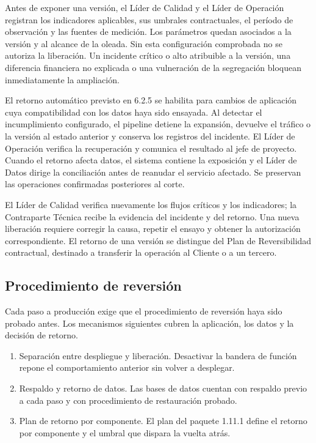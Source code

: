 \documentclass[11pt]{article}
\begin{document}
Antes de exponer una versión, el Líder de Calidad y el Líder de Operación registran los indicadores aplicables, sus umbrales contractuales, el período de observación y las fuentes de medición. Los parámetros quedan asociados a la versión y al alcance de la oleada. Sin esta configuración comprobada no se autoriza la liberación. Un incidente crítico o alto atribuible a la versión, una diferencia financiera no explicada o una vulneración de la segregación bloquean inmediatamente la ampliación.

El retorno automático previsto en 6.2.5 se habilita para cambios de aplicación cuya compatibilidad con los datos haya sido ensayada. Al detectar el incumplimiento configurado, el pipeline detiene la expansión, devuelve el tráfico o la versión al estado anterior y conserva los registros del incidente. El Líder de Operación verifica la recuperación y comunica el resultado al jefe de proyecto. Cuando el retorno afecta datos, el sistema contiene la exposición y el Líder de Datos dirige la conciliación antes de reanudar el servicio afectado. Se preservan las operaciones confirmadas posteriores al corte.

El Líder de Calidad verifica nuevamente los flujos críticos y los indicadores; la Contraparte Técnica recibe la evidencia del incidente y del retorno. Una nueva liberación requiere corregir la causa, repetir el ensayo y obtener la autorización correspondiente. El retorno de una versión se distingue del Plan de Reversibilidad contractual, destinado a transferir la operación al Cliente o a un tercero.

\subsection*{Procedimiento de reversión}

Cada paso a producción exige que el procedimiento de reversión haya sido probado antes. Los mecanismos siguientes cubren la aplicación, los datos y la decisión de retorno.

\begin{enumerate}
\item Separación entre despliegue y liberación. Desactivar la bandera de función repone el comportamiento anterior sin volver a desplegar.
\item Respaldo y retorno de datos. Las bases de datos cuentan con respaldo previo a cada paso y con procedimiento de restauración probado.
\item Plan de retorno por componente. El plan del paquete 1.11.1 define el retorno por componente y el umbral que dispara la vuelta atrás.
\end{enumerate}
\end{document}
